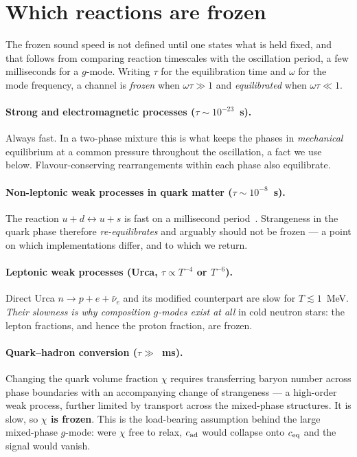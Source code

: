 \documentclass[aps,prd,twocolumn,superscriptaddress,nofootinbib,10pt]{revtex4-2}
\begin{document}
\section{Which reactions are frozen}

The frozen sound speed is not defined until one states what is held fixed, and
that follows from comparing reaction timescales with the oscillation period, a
few milliseconds for a $g$-mode. Writing $\tau$ for the equilibration time and
$\omega$ for the mode frequency, a channel is \emph{frozen} when
$\omega\tau\gg1$ and \emph{equilibrated} when $\omega\tau\ll1$.

\paragraph{Strong and electromagnetic processes ($\tau\sim10^{-23}$~s).}
Always fast. In a two-phase mixture this is what keeps the phases in
\emph{mechanical} equilibrium at a common pressure throughout the oscillation,
a fact we use below. Flavour-conserving rearrangements within each phase also
equilibrate.

\paragraph{Non-leptonic weak processes in quark matter ($\tau\sim10^{-8}$~s).}
The reaction $u+d\leftrightarrow u+s$ is fast on a millisecond
period~\cite{Madsen1993}. Strangeness in the quark phase therefore
\emph{re-equilibrates} and arguably should not be frozen --- a point on which
implementations differ, and to which we return.

\paragraph{Leptonic weak processes (Urca, $\tau\propto T^{-4}$ or $T^{-6}$).}
Direct Urca $n\to p+e+\bar\nu_{e}$ and its modified counterpart are slow for
$T\lesssim1$~MeV. \emph{Their slowness is why composition $g$-modes exist at
all} in cold neutron stars: the lepton fractions, and hence the proton fraction,
are frozen.

\paragraph{Quark--hadron conversion ($\tau\gg$~ms).}
Changing the quark volume fraction $\chi$ requires transferring baryon number
across phase boundaries with an accompanying change of strangeness --- a
high-order weak process, further limited by transport across the mixed-phase
structures. It is slow, so \textbf{$\chi$ is frozen}. This is the load-bearing
assumption behind the large mixed-phase $g$-mode: were $\chi$ free to relax,
$c_{\rm ad}$ would collapse onto $c_{\rm eq}$ and the signal would vanish.
\end{document}
